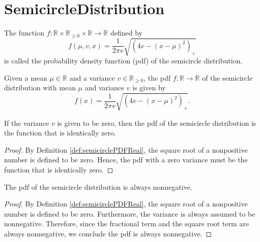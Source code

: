 \chapter{SemicircleDistribution}


\begin{definition}\label{def:semicirclePDFReal}
  \mathlibok 
    The function $f : \mathbb{R} \times \mathbb{R}_{\geq 0} \times \mathbb{R} \rightarrow \mathbb{R}$ defined by
   \[
    f(\mu,v,x) 
    = \frac{1}{2πv} \sqrt{(4v - (x - μ)^2)_+}
   \]
   is called the probability density function (pdf) of the semicircle distribution.
\end{definition}
\begin{lemma}\label{lem:semicirclePDFReal_def}
  \mathlibok 
    Given a mean $\mu \in \mathbb{R}$ and a variance $v \in \mathbb{R}_{\geq 0}$, the pdf $f : \mathbb{R} \rightarrow \mathbb{R}$ 
    of the semicircle distribution with mean $\mu$ and variance $v$ is given by
  \[
    f(x) = 
    \frac{1}{2πv} \sqrt{(4v - (x - μ)^2)_+}.
  \]
\end{lemma}
\begin{lemma}\label{lem:semicirclePDFReal_zero_var}
    \mathlibok
    If the variance $v$ is given to be zero, then the pdf of the semicircle distribution is the function that is identically zero.
\end{lemma}
\begin{proof}
    By Definition \ref{def:semicirclePDFReal}, the square root of a nonpositive number is defined to be zero.
    Hence, the pdf with a zero variance must be the function that is identically zero.
\end{proof}
\begin{lemma}\label{lem:semicirclePDFReal_nonneg}
    \mathlibok
    The pdf of the semicircle distribution is always nonnegative. 
\end{lemma}
\begin{proof}
   By Definition \ref{def:semicirclePDFReal}, the square root of a nonpositive number is defined to be zero. 
   Furthermore, the variance is always assumed to be nonnegative.
   Therefore, since the fractional term and the square root term are always nonnegative,
   we conclude the pdf is always nonnegative. 
\end{proof}
